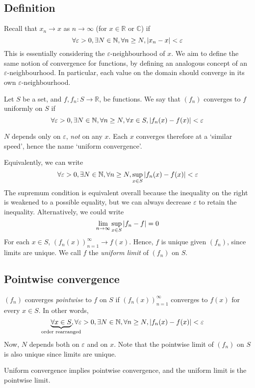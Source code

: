 \subsection{Definition}
Recall that \( x_n \to x \) as \( n \to \infty \) (for \( x \in \mathbb R\) or \(\mathbb C\)) if
\[
	\forall \varepsilon > 0, \exists N \in \mathbb N, \forall n \geq N, \abs{x_n-x} < \varepsilon
\]
This is essentially considering the \( \varepsilon \)-neighbourhood of \( x \).
We aim to define the same notion of convergence for functions, by defining an analogous concept of an \( \varepsilon \)-neighbourhood.
In particular, each value on the domain should converge in its own \( \varepsilon \)-neighbourhood.
\begin{definition}
	Let \( S \) be a set, and \( f, f_n \colon S \to \mathbb R \), be functions.
	We say that \( (f_n) \) converges to \( f \) uniformly on \( S \) if
	\[
		\forall \varepsilon > 0, \exists N \in \mathbb N, \forall n \geq N, \forall x \in S, \abs{f_n(x) - f(x)} < \varepsilon
	\]
\end{definition}
\begin{note}
	\( N \) depends only on \( \varepsilon \), \textit{not} on any \( x \).
	Each \( x \) converges therefore at a `similar speed', hence the name `uniform convergence'.
\end{note}
Equivalently, we can write
\[
	\forall \varepsilon > 0, \exists N \in \mathbb N, \forall n \geq N, \sup_{x \in S} \abs{f_n(x) - f(x)} < \varepsilon
\]
The supremum condition is equivalent overall because the inequality on the right is weakened to a possible equality, but we can always decrease \( \varepsilon \) to retain the inequality.
Alternatively, we could write
\[
	\lim_{n \to \infty} \sup_{x \in S} \abs{f_n - f} = 0
\]
For each \( x \in S \), \( (f_n(x))_{n=1}^\infty \to f(x) \).
Hence, \( f \) is unique given \( (f_n) \), since limits are unique.
We call \( f \) the \textit{uniform limit} of \( (f_n) \) on \( S \).

\subsection{Pointwise convergence}
\begin{definition}
	\( (f_n) \) converges \textit{pointwise} to \( f \) on \( S \) if \( (f_n(x))_{n=1}^\infty \) converges to \( f(x) \) for every \( x \in S \).
	In other words,
	\[
		\underbrace{\forall x \in S}_{\mathclap{\text{order rearranged}}}, \forall \varepsilon > 0, \exists N \in \mathbb N, \forall n \geq N, \abs{f_n(x) - f(x)} < \varepsilon
	\]
	Now, \( N \) depends both on \( \varepsilon \) and on \( x \).
	Note that the pointwise limit of \( (f_n) \) on \( S \) is also unique since limits are unique.
\end{definition}
\begin{remark}
	Uniform convergence implies pointwise convergence, and the uniform limit is the pointwise limit.
\end{remark}

